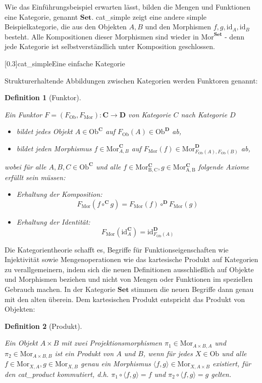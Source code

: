 \documentclass[a4paper, bibgerm]{article}
\newcommand\abb{}
\newcommand\fig{}
\newtheorem{defini}{Definition}
\newcommand{\defi}[2]{%
  \begin{defini}[#1]
    \label{def:#1}
    #2
  \end{defini}
}
\begin{document}
Wie das Einführungsbeispiel erwarten lässt, bilden die Mengen und
Funktionen eine Kategorie, genannt $\mathbf{Set}$. \abb{cat_simple} zeigt eine
andere simple Beispielkategorie, die aus den Objekten $A, B$ und den
Morphismen $f, g, \mathrm{id}_A, \mathrm{id}_B$ besteht. Alle Kompositionen
dieser Morphismen sind wieder in $\mathrm{Mor}^{\mathbf{Set}}$ - denn
jede Kategorie ist selbstverständlich unter Komposition geschlossen.

\fig[0.3]{cat_simple}{Eine einfache Kategorie}

Strukturerhaltende Abbildungen zwischen Kategorien werden Funktoren genannt:

\defi{Funktor}{
Ein Funktor $F=(F_{\mathrm{Ob}},F_{\mathrm{Mor}}) : \mathbf{C}
\rightarrow \mathbf{D}$ von Kategorie $C$ nach Kategorie $D$  
    \begin{itemize}
    \item bildet jedes Objekt $A \in \mathrm{Ob}^{\mathbf{C}}$ auf $F_{\mathrm{Ob}}(A) \in
      \mathrm{Ob}^{\mathbf{D}}$ ab, 
    \item bildet jeden Morphismus $f \in
      \mathrm{Mor}^{\mathbf{C}}_{A,B}$ auf $F_{\mathrm{Mor}}(f) \in
      \mathrm{Mor}^{\mathbf{D}}_{F_{\mathrm{Ob}}(A),F_{\mathrm{Ob}}(B)}$
      ab,
    \end{itemize}   
    wobei für alle $A,B,C \in \mathrm{Ob}^{\mathbf{C}}$ und alle $f \in
    \mathrm{Mor^{\mathbf{C}}_{B,C}},g \in
    \mathrm{Mor^{\mathbf{C}}_{A,B}}$ folgende Axiome erfüllt sein 
    müssen: 
    \begin{itemize}
    \item Erhaltung der Komposition:
      $$F_{\mathrm{Mor}}(f \circ^{\mathbf{C}} g) =
      F_{\mathrm{Mor}}(f) \circ^{\mathbf{D}} F_{\mathrm{Mor}}(g)$$
    \item Erhaltung der Identität:
      $$F_{\mathrm{Mor}}(\mathrm{id}^{\mathbf{C}}_A) =
      \mathrm{id}^{\mathbf{D}}_{F_{\mathrm{Ob}}(A)}$$
    \end{itemize}
}

Die Kategorientheorie schafft es, Begriffe für Funktionseigenschaften
wie Injektivität sowie Mengenoperationen wie das kartesische Produkt auf
Kategorien zu verallgemeinern, indem sich die neuen Definitionen
ausschließlich auf Objekte und Morphismen beziehen und nicht von Mengen
oder Funktionen im speziellen Gebrauch machen. In der Kategorie
$\mathbf{Set}$ stimmen die neuen Begriffe dann genau mit den alten
überein. Dem kartesischen Produkt entspricht das Produkt von Objekten:

\defi{Produkt}{
  Ein Objekt $A \times B$ mit zwei Projektionsmorphismen $\pi_1
  \in \mathrm{Mor}_{A \times B,A}$ und $\pi_2 \in \mathrm{Mor}_{A \times
    B,B}$ ist ein Produkt von $A$ und $B$, wenn für jedes $X \in
  \mathrm{Ob}$ und alle $f \in \mathrm{Mor}_{X,A},g \in
  \mathrm{Mor}_{X,B}$ genau ein Morphismus
  $\langle f,g \rangle \in \mathrm{Mor}_{X,A \times B}$ existiert, für den \abb{cat_product} kommutiert, d.h. 
  $\pi_1 \circ \langle f,g \rangle = f$ und $\pi_2 \circ \langle f,g \rangle = g$ gelten.
}
\end{document}
